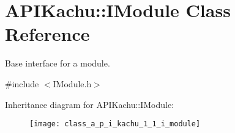 \hypertarget{class_a_p_i_kachu_1_1_i_module}{}\section{A\+P\+I\+Kachu\+:\+:I\+Module Class Reference}
\label{class_a_p_i_kachu_1_1_i_module}


Base interface for a module.  




{\ttfamily \#include $<$I\+Module.\+h$>$}

Inheritance diagram for A\+P\+I\+Kachu\+:\+:I\+Module\+:\begin{figure}[H]
\begin{center}
\leavevmode
\texttt{[image: class\_a\_p\_i\_kachu\_1\_1\_i\_module]}
\end{center}
\end{figure}

